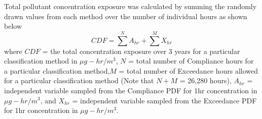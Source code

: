%
Total pollutant concentration exposure was calculated by summing the randomly drawn values from each method over the number of individual hours as shown below
%
\begin{equation}
\label{eq3:cdfsum}
CDF=\sum^{N}A_{hr} + \sum^{M}X_{hr}
\end{equation}
%
\noindent
where 	$CDF$ = the total concentration exposure over 3 years for a particular classification method in $\mu g-hr/m^{3}$, $N$ = total number of Compliance hours for a particular classification method,$M$ = total number of Exceedance hours allowed for a particular classification method (Note that $N + M$ = 26,280 hours), $A_{hr}$ = independent variable sampled from the Compliance PDF for 1hr concentration in $\mu g-hr/m^{3}$, and $X_{hr}$ = independent variable sampled from the Exceedance PDF for 1hr concentration in $\mu g-hr/m^{3}$.

